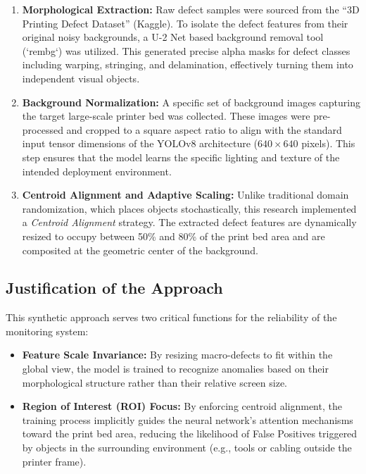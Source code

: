 \documentclass[english, Lau, oneside]{sapthesis}
\begin{document}
\begin{enumerate}
    \item \textbf{Morphological Extraction:} 
    Raw defect samples were sourced from the ``3D Printing Defect Dataset'' (Kaggle). To isolate the defect features from their original noisy backgrounds, a U-2 Net based background removal tool (`rembg`) was utilized. This generated precise alpha masks for defect classes including warping, stringing, and delamination, effectively turning them into independent visual objects.

    \item \textbf{Background Normalization:}
    A specific set of background images capturing the target large-scale printer bed was collected. These images were pre-processed and cropped to a square aspect ratio to align with the standard input tensor dimensions of the YOLOv8 architecture ($640 \times 640$ pixels). This step ensures that the model learns the specific lighting and texture of the intended deployment environment.

    \item \textbf{Centroid Alignment and Adaptive Scaling:}
    Unlike traditional domain randomization, which places objects stochastically, this research implemented a \textit{Centroid Alignment} strategy. The extracted defect features are dynamically resized to occupy between 50\% and 80\% of the print bed area and are composited at the geometric center of the background. 
\end{enumerate}

\subsection{Justification of the Approach}
This synthetic approach serves two critical functions for the reliability of the monitoring system:

\begin{itemize}
    \item \textbf{Feature Scale Invariance:} By resizing macro-defects to fit within the global view, the model is trained to recognize anomalies based on their morphological structure rather than their relative screen size.
    \item \textbf{Region of Interest (ROI) Focus:} By enforcing centroid alignment, the training process implicitly guides the neural network's attention mechanisms toward the print bed area, reducing the likelihood of False Positives triggered by objects in the surrounding environment (e.g., tools or cabling outside the printer frame).
\end{itemize}
\end{document}
